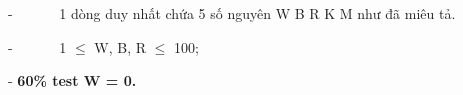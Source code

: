 -       1 dòng duy nhất chứa 5 số nguyên W B R K M như đã miêu tả.  

   -       1  $\le$  W, B, R  $\le$  100;  

   -   \textbf{    60\% test W = 0.   }

\